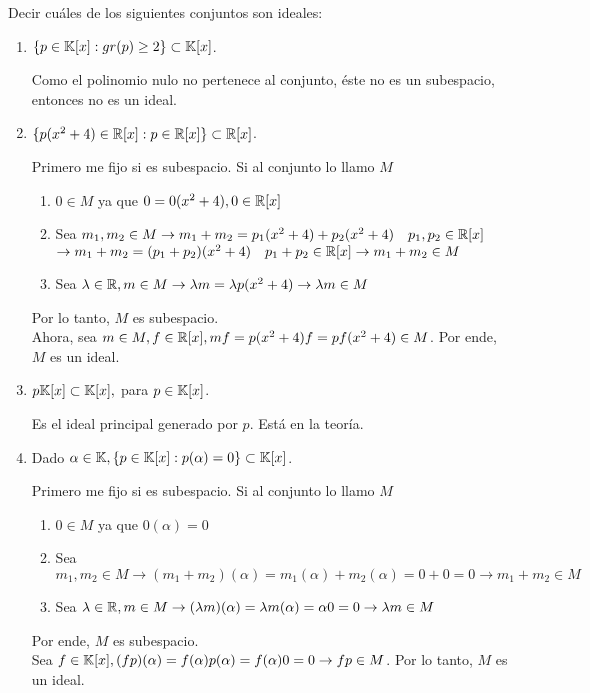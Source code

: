 \item Decir cuáles de los siguientes conjuntos son ideales:
    \begin{enumerate}
        \item $\{p\in\mathbb{K}[x]:gr(p)\geq2\}\subset\mathbb{K}[x]$.
            \begin{mdframed}[style=s]
                Como el polinomio nulo no pertenece al conjunto, éste no es un subespacio, entonces no es un ideal.
            \end{mdframed}
        \item $\{p(x^2+4)\in\mathbb{R}[x]:p\in\mathbb{R}[x]\}\subset\mathbb{R}[x]$.
            \begin{mdframed}[style=s]
                Primero me fijo si es subespacio. Si al conjunto lo llamo $M$
                \begin{enumerate}
                    \item $0\in M$ ya que $0=0(x^2+4), 0\in\mathbb{R}[x]$
                    \item Sea $m_1,m_2\in M\to m_1+m_2=p_1(x^2+4)+p_2(x^2+4)\quad p_1,p_2\in\mathbb{R}[x]$\\$\to m_1+m_2=(p_1+p_2)(x^2+4)\quad p_1+p_2\in\mathbb{R}[x]\to m_1+m_2\in M$
                    \item Sea $\lambda\in\mathbb{R}, m\in M\to \lambda m=\lambda p(x^2+4)\to \lambda m\in M$
                \end{enumerate}
                Por lo tanto, $M$ es subespacio.\\
                Ahora, sea $m\in M,f\in\mathbb{R}[x], mf=p(x^2+4)f=pf(x^2+4)\in M$. Por ende, $M$ es un ideal.
            \end{mdframed}
        \item $p\mathbb{K}[x]\subset\mathbb{K}[x],$ para $p\in\mathbb{K}[x]$.
            \begin{mdframed}[style=s]
                Es el ideal principal generado por $p$. Está en la teoría.
            \end{mdframed}
        \item Dado $\alpha\in\mathbb{K}, \{p\in\mathbb{K}[x]:p(\alpha)=0\}\subset\mathbb{K}[x]$.
            \begin{mdframed}[style=s]
                Primero me fijo si es subespacio. Si al conjunto lo llamo $M$
                \begin{enumerate}
                    \item $0\in M$ ya que $0(\alpha)=0$
                    \item Sea $m_1,m_2\in M\to (m_1+m_2)(\alpha)=m_1(\alpha)+m_2(\alpha)=0+0=0\to m_1+m_2\in M$
                    \item Sea $\lambda\in\mathbb{R}, m\in M\to (\lambda m)(\alpha)=\lambda m(\alpha)=\alpha0=0\to \lambda m\in M$
                \end{enumerate}
                Por ende, $M$ es subespacio.\\
                Sea $f\in\mathbb{K}[x], (fp)(\alpha)=f(\alpha)p(\alpha)=f(\alpha)0=0\to fp\in M$. Por lo tanto, $M$ es un ideal.
            \end{mdframed}
    \end{enumerate}